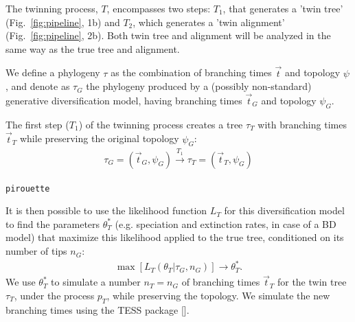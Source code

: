 The twinning process, $T$, encompasses two steps:
$T_1$, that generates a 'twin tree' (Fig.~\ref{fig:pipeline}, 1b) 
and $T_2$, which generates a 'twin alignment' (Fig.~\ref{fig:pipeline}, 2b).
Both twin tree and alignment will be analyzed in the same way as the true tree and alignment.

We define a phylogeny $\tau$ as the combination of
branching times $\Vec{t}$ and topology $\psi$, 
and denote as $\tau_{\mathit{G}}$ the phylogeny 
produced by a (possibly non-standard) generative diversification model, 
having branching times $\Vec{t}_{\mathit{G}}$ and 
topology $\psi_{\mathit{G}}$.

The first step ($T_1$) of the twinning process creates a tree $\tau_{\mathit{T}}$
with branching times $\Vec{t}_{\mathit{T}}$ while preserving the original
topology $\psi_{\mathit{G}}$:
\begin{align}
  \tau_{\mathit{G}} = (\Vec{t}_{\mathit{G}}, \psi_{\mathit{G}}) 
  \xrightarrow[]{\mathit{T_1}} 
  \tau_{\mathit{T}} = (\Vec{t}_{\mathit{T}}, \psi_{\mathit{G}})
\end{align}

\verb;pirouette;

It is then possible to use the likelihood function 
$L_{\mathit{T}}$ for this diversification model to find 
the parameters $\theta^{*}_{\mathit{T}}$ 
(e.g. speciation and extinction rates, in case of a BD model) 
that maximize this likelihood applied to the true tree, conditioned on its number of tips $n_{\mathit{G}}$:
\begin{align}
    \max[L_{\mathit{T}}(\theta_{\mathit{T}}|\tau_{\mathit{G}}, n_{\mathit{G}})] 
\rightarrow \theta^{*}_{\mathit{T}}.
\end{align}
We use $\theta^{*}_{\mathit{T}}$ to simulate a number 
$n_{\mathit{T}} = n_{\mathit{G}}$ 
of branching times $\Vec{t}_{\mathit{T}}$ for the twin tree 
$\tau_{\mathit{T}}$, under the process $p_{T}$, 
while preserving the topology. 
We simulate the new branching times using the TESS 
package [\cite{TESS, hohna2016tess}].


